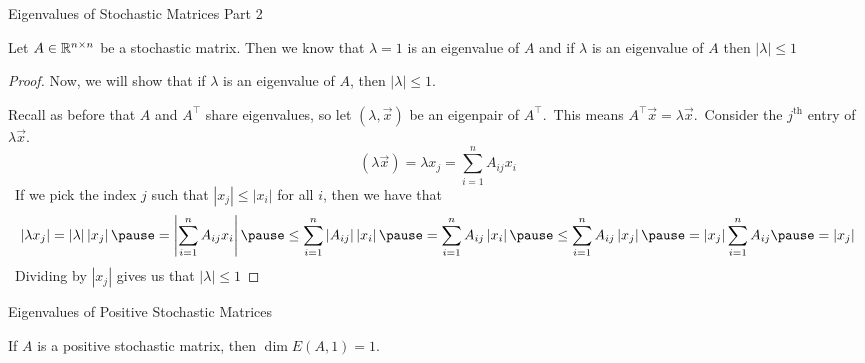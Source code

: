 \documentclass[xcoler=dvipsnames, aspectratio=169]{beamer}
\newcommand{\abs}[1]{\left|#1\right|}
\begin{document}
    \begin{frame}{Eigenvalues of Stochastic Matrices Part 2}
        \footnotesize
        \begin{theorem}
            Let $A\in\mathbb{R}^{n\times n}$ be a stochastic matrix. Then we know that $\lambda=1$ is an
            eigenvalue of $A$ and if $\lambda$ is an eigenvalue of $A$ then $\abs{\lambda}\leq 1$
        \end{theorem}\pause
        \begin{proof}
            Now, we will show that if $\lambda$ is an eigenvalue of $A$, then $\abs{\lambda}\leq 1$.\pause

            Recall as before that $A$ and $A^\top$ share eigenvalues, so let $(\lambda,\vec{x})$
            be an eigenpair of $A^\top$.\pause\ This means $A^\top\vec{x} = \lambda\vec{x}$.\pause\
            Consider the $j^\text{th}$ entry of $\lambda\vec{x}$.
            \vspace{-5pt}
            \[
                (\lambda\vec{x}) = \lambda x_j = \sum_{i=1}^n A_{ij}x_i
            \]\pause\
            If we pick the index $j$ such that $\abs{x_j}\leq\abs{x_i}$ for all $i$, 
            then we have that\pause\
            \[
                \abs{\lambda x_j} = \abs{\lambda}\abs{x_j}\pause = \abs{\sum_{i=1}^n A_{ij}x_i}
                \pause\leq \sum_{i=1}^n\abs{A_{ij}}\abs{x_i}\pause = \sum_{i=1}^nA_{ij}\abs{x_i}
                \pause\leq \sum_{i=1}^nA_{ij}\abs{x_j}\pause = \abs{x_j}\sum_{i=1}^nA_{ij}\pause = 
                \abs{x_j}
            \]\pause\
            Dividing by $\abs{x_j}$ gives us that $\abs{\lambda}\leq 1$
        \end{proof}
    \end{frame}
    \begin{frame}{Eigenvalues of Positive Stochastic Matrices}
        \begin{theorem}
            If $A$ is a positive stochastic matrix, then $\dim{E(A,1)} = 1$.
        \end{theorem}
        \vspace{130pt}
    \end{frame}
\end{document}
